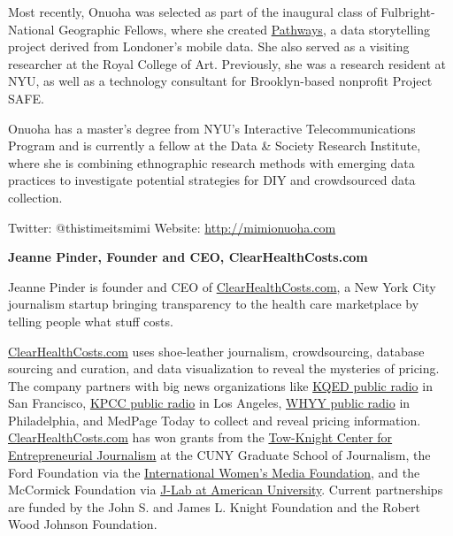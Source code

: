 \begin{itemize}
Most recently, Onuoha was selected as part of the inaugural class of Fulbright-National Geographic Fellows, where she created \href{http://www.nationalgeographic.com/pathways}{Pathways},\autocite{Pathways} a data storytelling project derived from Londoner’s mobile data. She also served as a visiting researcher at the Royal College of Art. Previously, she was a research resident at NYU, as well as a technology consultant for Brooklyn-based nonprofit Project SAFE. 

Onuoha has a master’s degree from NYU’s Interactive Telecommunications Program and is currently a fellow at the Data & Society Research Institute, where she is combining ethnographic research methods with emerging data practices to investigate potential strategies for DIY and crowdsourced data collection.

Twitter: @thistimeitsmimi 
Website: \href{http://mimionuoha.com}{http://mimionuoha.com}

\textbf{Jeanne Pinder, Founder and CEO, ClearHealthCosts.com}

Jeanne Pinder is founder and CEO of \href{http://clearhealthcosts.com/}{ClearHealthCosts.com}, a New York City journalism startup bringing transparency to the health care marketplace by telling people what stuff costs. 

\href{http://clearhealthcosts.com/}{ClearHealthCosts.com} uses shoe-leather journalism, crowdsourcing, database sourcing and curation, and data visualization to reveal the mysteries of pricing. The company partners with big news organizations like \href{http://ww2.kqed.org/stateofhealth/2014/06/23/share-your-bill-make-health-costs-transparent-in-california/}{KQED public radio} in San Francisco, \href{http://www.scpr.org/price-check}{KPCC public radio} in Los Angeles, \href{http://www.newsworks.org/index.php/local/item/77899}{WHYY public radio} in Philadelphia, and MedPage Today to collect and reveal pricing information. \href{http://clearhealthcosts.com/}{ClearHealthCosts.com} has won grants from the \href{http://towknight.org/2010/12/2010awards/}{Tow-Knight Center for Entrepreneurial Journalism} at the CUNY Graduate School of Journalism, the Ford Foundation via the \href{http://www.iwmf.org/women-entrepreneurs-in-digital-news-jeanne-pinder/}{International Women’s Media Foundation}, and the McCormick Foundation via \href{http://www.newmediawomen.org/site/2012_winners}{J-Lab at American University}. Current partnerships are funded by the John S. and James L. Knight Foundation and the Robert Wood Johnson Foundation.


\end{itemize}
